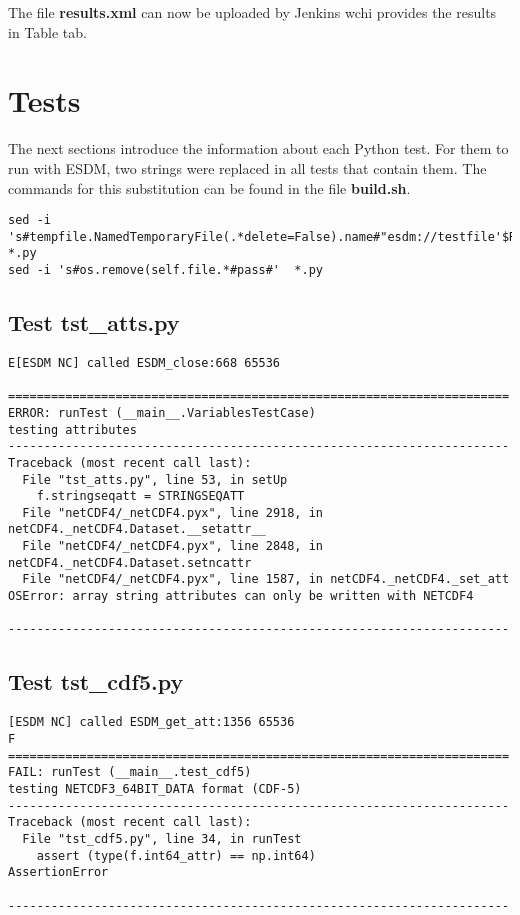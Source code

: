 The file \textbf{results.xml} can now be uploaded by Jenkins wchi provides the results in Table tab.

\section{Tests}

\tab
The next sections introduce the information about each Python test. For them to run with ESDM, two strings were replaced in all tests that contain them. The commands for this substitution can be found in the file \textbf{build.sh}.

\begin{verbatim}
sed -i 's#tempfile.NamedTemporaryFile(.*delete=False).name#"esdm://testfile'$RANDOM'"#'  *.py
sed -i 's#os.remove(self.file.*#pass#'  *.py
\end{verbatim}

\subsection{Test tst\_atts.py}

\begin{verbatim}
E[ESDM NC] called ESDM_close:668 65536

======================================================================
ERROR: runTest (__main__.VariablesTestCase)
testing attributes
----------------------------------------------------------------------
Traceback (most recent call last):
  File "tst_atts.py", line 53, in setUp
    f.stringseqatt = STRINGSEQATT
  File "netCDF4/_netCDF4.pyx", line 2918, in netCDF4._netCDF4.Dataset.__setattr__
  File "netCDF4/_netCDF4.pyx", line 2848, in netCDF4._netCDF4.Dataset.setncattr
  File "netCDF4/_netCDF4.pyx", line 1587, in netCDF4._netCDF4._set_att
OSError: array string attributes can only be written with NETCDF4

----------------------------------------------------------------------
\end{verbatim}

\subsection{Test tst\_cdf5.py}

\begin{verbatim}
[ESDM NC] called ESDM_get_att:1356 65536
F
======================================================================
FAIL: runTest (__main__.test_cdf5)
testing NETCDF3_64BIT_DATA format (CDF-5)
----------------------------------------------------------------------
Traceback (most recent call last):
  File "tst_cdf5.py", line 34, in runTest
    assert (type(f.int64_attr) == np.int64)
AssertionError

----------------------------------------------------------------------
\end{verbatim}

